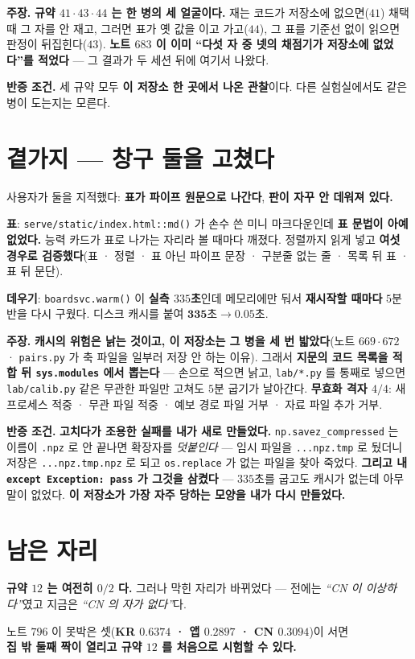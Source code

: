 \documentclass[10pt,a4paper]{article}
\newcommand{\claim}[2]{\begin{claimbox}\textbf{주장.} #1\par\smallskip
  \textcolor{gray!70}{\textbf{반증 조건.} #2}\end{claimbox}}
\begin{document}
\claim{\textbf{규약 $41 \cdot 43 \cdot 44$ 는 한 병의 세 얼굴이다.} 재는 코드가
저장소에 없으면($41$) 채택 때 그 자를 안 재고, 그러면 표가 옛 값을 이고 가고($44$),
그 표를 기준선 없이 읽으면 판정이 뒤집힌다($43$). \textbf{노트 $683$ 이 이미
``다섯 자 중 넷의 채점기가 저장소에 없었다''를 적었다} --- 그 결과가 두 세션 뒤에
여기서 나왔다.}
{세 규약 모두 \textbf{이 저장소 한 곳에서 나온 관찰}이다. 다른 실험실에서도 같은
병이 도는지는 모른다.}

\section{곁가지 --- 창구 둘을 고쳤다}

사용자가 둘을 지적했다: \textbf{표가 파이프 원문으로 나간다}, \textbf{판이 자꾸 안
데워져 있다.}

\textbf{표}: \texttt{serve/static/index.html::md()} 가 손수 쓴 미니 마크다운인데
\textbf{표 문법이 아예 없었다.} 능력 카드가 표로 나가는 자리라 볼 때마다 깨졌다.
정렬까지 읽게 넣고 \textbf{여섯 경우로 검증했다}(표 · 정렬 · 표 아닌 파이프 문장 ·
구분줄 없는 줄 · 목록 뒤 표 · 표 뒤 문단).

\textbf{데우기}: \texttt{boardsvc.warm()} 이 \textbf{실측 $335$초}인데 메모리에만
둬서 \textbf{재시작할 때마다} $5$분 반을 다시 구웠다. 디스크 캐시를 붙여
$\mathbf{335\text{초} \to 0.05\text{초}}$.

\claim{\textbf{캐시의 위험은 낡는 것이고, 이 저장소는 그 병을 세 번 밟았다}(노트
$669 \cdot 672$ · \texttt{pairs.py} 가 축 파일을 일부러 저장 안 하는 이유). 그래서
\textbf{지문의 코드 목록을 적합 뒤 \texttt{sys.modules} 에서 뽑는다} --- 손으로
적으면 낡고, \texttt{lab/*.py} 를 통째로 넣으면 \texttt{lab/calib.py} 같은 무관한
파일만 고쳐도 $5$분 굽기가 날아간다. \textbf{무효화 격자 $4/4$}: 새 프로세스 적중 ·
무관 파일 적중 · 예보 경로 파일 거부 · 자료 파일 추가 거부.}
{\textbf{고치다가 조용한 실패를 내가 새로 만들었다.} \texttt{np.savez\_compressed}
는 이름이 \texttt{.npz} 로 안 끝나면 확장자를 \emph{덧붙인다} --- 임시 파일을
\texttt{...npz.tmp} 로 뒀더니 저장은 \texttt{...npz.tmp.npz} 로 되고
\texttt{os.replace} 가 없는 파일을 찾아 죽었다. \textbf{그리고 내
\texttt{except Exception: pass} 가 그것을 삼켰다} --- $335$초를 굽고도 캐시가 없는데
아무 말이 없었다. \textbf{이 저장소가 가장 자주 당하는 모양을 내가 다시 만들었다.}}

\section{남은 자리}

\textbf{규약 $12$ 는 여전히 $0/2$ 다.} 그러나 막힌 자리가 바뀌었다 --- 전에는
\emph{``CN 이 이상하다''}였고 지금은 \emph{``CN 의 자가 없다''}다.

\begin{center}
노트 $796$ 이 못박은 셋(\textbf{KR $0.6374$ · 앱 $0.2897$ · CN $0.3094$})이 서면\\
\textbf{집 밖 둘째 짝이 열리고 규약 $12$ 를 처음으로 시험할 수 있다.}
\end{center}
\end{document}
